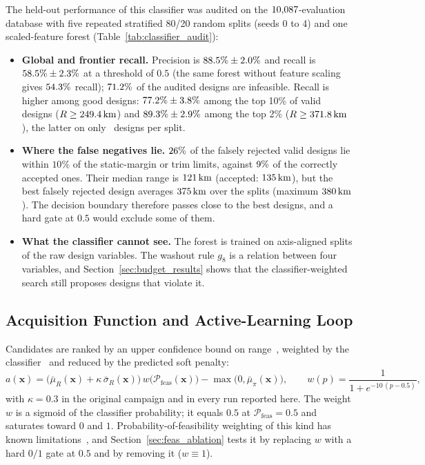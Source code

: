 The held-out performance of this classifier was audited on the $10{,}087$-evaluation database with five repeated stratified 80/20 random splits (seeds 0 to 4) and one scaled-feature forest (Table~\ref{tab:classifier_audit}):
\begin{itemize}
    \item \textbf{Global and frontier recall.} Precision is $88.5\% \pm 2.0\%$ and recall is $58.5\% \pm 2.3\%$ at a threshold of $0.5$ (the same forest without feature scaling gives $54.3\%$ recall); $71.2\%$ of the audited designs are infeasible. Recall is higher among good designs: $77.2\% \pm 3.8\%$ among the top 10\% of valid designs ($R \ge 249.4\,\mathrm{km}$) and $89.3\% \pm 2.9\%$ among the top 2\% ($R \ge 371.8\,\mathrm{km}$), the latter on only \NfnTwoN\ designs per split.
    \item \textbf{Where the false negatives lie.} $26\%$ of the falsely rejected valid designs lie within $10\%$ of the static-margin or trim limits, against $9\%$ of the correctly accepted ones. Their median range is $121\,\mathrm{km}$ (accepted: $135\,\mathrm{km}$), but the best falsely rejected design averages $375\,\mathrm{km}$ over the splits (maximum $380\,\mathrm{km}$). The decision boundary therefore passes close to the best designs, and a hard gate at $0.5$ would exclude some of them.
    \item \textbf{What the classifier cannot see.} The forest is trained on axis-aligned splits of the raw design variables. The washout rule $g_8$ is a relation between four variables, and Section~\ref{sec:budget_results} shows that the classifier-weighted search still proposes designs that violate it.
\end{itemize}

\subsection{Acquisition Function and Active-Learning Loop}
\label{sec:al_loop}
Candidates are ranked by an upper confidence bound on range~\cite{srinivas2012information}, weighted by the classifier~\cite{gelbart2014bayesian} and reduced by the predicted soft penalty:
\begin{equation}
a(\mathbf{x}) = \big( \bar{\mu}_R(\mathbf{x}) + \kappa\, \bar{\sigma}_R(\mathbf{x}) \big)\, w\!\big(\mathcal{P}_{\mathrm{feas}}(\mathbf{x})\big) - \max\!\big(0, \bar{\mu}_{\pi}(\mathbf{x})\big), \qquad w(p) = \frac{1}{1 + e^{-10\,(p - 0.5)}} ,
\label{eq:ucb_acquisition}
\end{equation}
with $\kappa = 0.3$ in the original campaign and in every run reported here. The weight $w$ is a sigmoid of the classifier probability; it equals $0.5$ at $\mathcal{P}_{\mathrm{feas}} = 0.5$ and saturates toward $0$ and $1$. Probability-of-feasibility weighting of this kind has known limitations~\cite{cordelier2026multifidelity}, and Section~\ref{sec:feas_ablation} tests it by replacing $w$ with a hard $0/1$ gate at $0.5$ and by removing it ($w \equiv 1$).


